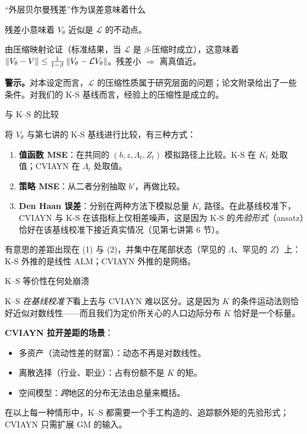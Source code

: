 \documentclass[10pt,aspectratio=169]{beamer}
\newcommand{\Lop}{\mathcal{L}}
\begin{document}
\begin{frame}{“外层贝尔曼残差”作为误差意味着什么}

残差小意味着 $V_\theta$ 近似是 $\Lop$ 的不动点。

\smallskip

由压缩映射论证（标准结果，当 $\Lop$ 是 $\beta$-压缩时成立），这意味着 $\norm{V_\theta - V} \leq \frac{1}{1-\beta}\norm{V_\theta - \Lop V_\theta}$。残差小 $\Rightarrow$ 离真值近。

\smallskip

\textbf{警示。}对本设定而言，$\Lop$ 的压缩性质属于研究层面的问题；论文附录给出了一些条件。对我们的 K-S 基线而言，经验上的压缩性是成立的。

\end{frame}

\begin{frame}{与 K--S 的比较}

将 $V_\theta$ 与第七讲的 K-S 基线进行比较，有三种方式：
\begin{enumerate}
  \item \textbf{值函数 MSE}：在共同的 $(b, z, \Lambda_t, Z_t)$ 模拟路径上比较。K-S 在 $K_t$ 处取值；CVIAYN 在 $\Lambda_t$ 处取值。
  \item \textbf{策略 MSE}：从二者分别抽取 $b'$，再做比较。
  \item \textbf{Den Haan 误差}：分别在两种方法下模拟总量 $K_t$ 路径。在此基线校准下，CVIAYN 与 K-S 在该指标上仅相差噪声，这是因为 K-S 的\emph{先验形式}（ansatz）恰好在该基线校准下接近真实情况（见第七讲第 6 节）。
\end{enumerate}

\smallskip

有意思的差距出现在 (1) 与 (2)，并集中在尾部状态（罕见的 $\Lambda$、罕见的 $Z$）上：K-S 外推的是线性 ALM；CVIAYN 外推的是网络。

\end{frame}

\begin{frame}{K--S 等价性在何处崩溃}

K--S \emph{在基线校准下}看上去与 CVIAYN 难以区分。这是因为 $K$ 的条件运动法则恰好近似对数线性——而且我们为定价所关心的人口边际分布 $K$ 恰好是一个标量。

\smallskip

\textbf{CVIAYN 拉开差距的场景}：

\begin{itemize}
  \item 多资产（流动性差的财富）：动态不再是对数线性。
  \item 离散选择（行业、职业）：占有份额不是 $K$ 的矩。
  \item 空间模型：\emph{跨}地区的分布无法由总量来概括。
\end{itemize}

在以上每一种情形中，K--S 都需要一个手工构造的、追踪额外矩的先验形式；CVIAYN 只需扩展 GM 的输入。

\end{frame}
\end{document}
